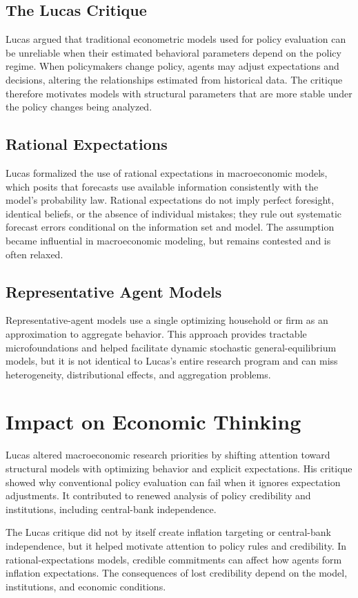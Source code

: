 \subsection*{The Lucas Critique}
Lucas argued that traditional econometric models used for policy evaluation can
be unreliable when their estimated behavioral parameters depend on the policy
regime. When policymakers change policy, agents may adjust expectations and
decisions, altering the relationships estimated from historical data. The
critique therefore motivates models with structural parameters that are more
stable under the policy changes being analyzed.

\subsection*{Rational Expectations}
Lucas formalized the use of rational expectations in macroeconomic models,
which posits that forecasts use available information consistently with the
model's probability law. Rational expectations do not imply perfect foresight,
identical beliefs, or the absence of individual mistakes; they rule out
systematic forecast errors conditional on the information set and model.
The assumption became influential in macroeconomic modeling, but remains
contested and is often relaxed.

\subsection*{Representative Agent Models}
Representative-agent models use a single optimizing household or firm as an
approximation to aggregate behavior. This approach provides tractable
microfoundations and helped facilitate dynamic stochastic general-equilibrium
models, but it is not identical to Lucas's entire research program and can miss
heterogeneity, distributional effects, and aggregation problems.

\section{Impact on Economic Thinking}
Lucas altered macroeconomic research priorities by shifting attention toward
structural models with optimizing behavior and explicit expectations. His
critique showed why conventional policy evaluation can fail when it ignores
expectation adjustments. It contributed to renewed analysis of policy
credibility and institutions, including central-bank independence.

The Lucas critique did not by itself create inflation targeting or central-bank
independence, but it helped motivate attention to policy rules and credibility.
In rational-expectations models, credible commitments can affect how agents
form inflation expectations. The consequences of lost credibility depend on
the model, institutions, and economic conditions.

